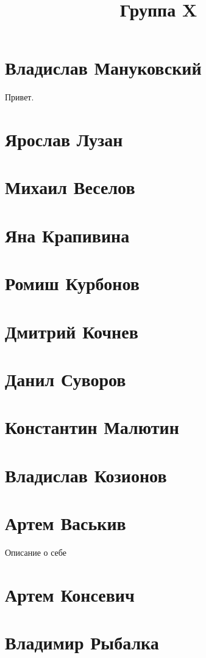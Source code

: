 \documentclass{article}
\title{Группа X}
\begin{document}
\section*{Владислав Мануковский}
Привет.
\section*{Ярослав Лузан}

\section*{Михаил Веселов}

\section*{Яна Крапивина}

\section*{Ромиш Курбонов}

\section*{Дмитрий Кочнев}

\section*{Данил Суворов}

\section*{Константин Малютин}

\section*{Владислав Козионов}

\section*{Артем Васькив}
Описание о себе
\section*{Артем Консевич}

\section*{Владимир Рыбалка}
\end{document}
